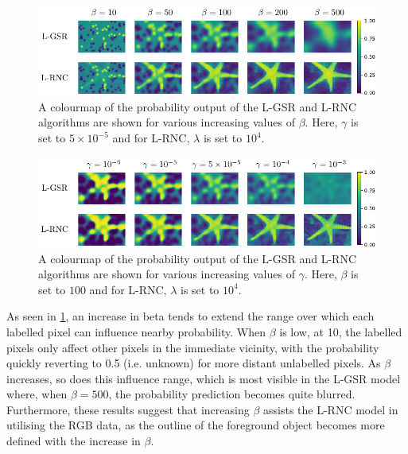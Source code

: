 \begin{figure}[t] 
    \begin{center}
        \includegraphics[width=\linewidth]{Figures/starfish2.pdf}
    \end{center}
   \caption[Qualitative effects of varying $\beta$ on the output of the L-GSR and L-RNC algorithms]{A colourmap of the probability output of the L-GSR and L-RNC algorithms are shown for various increasing values of $\beta$. Here, $\gamma$ is set to $5 \times 10^{-5}$ and for L-RNC, $\lambda$ is set to $10^4$. } 
    \label{fig:starfish2}
\end{figure}

\begin{figure}[t] 
    \begin{center}
        \includegraphics[width=\linewidth]{Figures/starfish3.pdf}
    \end{center}
    \caption[Qualitative effects of varying $\gamma$ on the output of the L-GSR and L-RNC algorithms]{A colourmap of the probability output of the L-GSR and L-RNC algorithms are shown for various increasing values of $\gamma$. Here, $\beta$ is set to $100$ and for L-RNC, $\lambda$ is set to $10^4$.}
    \label{fig:starfish3}
\end{figure}


As seen in \cref{fig:starfish2}, an increase in beta tends to extend the range over which each labelled pixel can influence nearby probability. When $\beta$ is low, at 10, the labelled pixels only affect other pixels in the immediate vicinity, with the probability quickly reverting to 0.5 (i.e. unknown) for more distant unlabelled pixels. As $\beta$ increases, so does this influence range, which is most visible in the L-GSR model where, when $\beta = 500$, the probability prediction becomes quite blurred. Furthermore, these results suggest that increasing $\beta$ assists the L-RNC model in utilising the RGB data, as the outline of the foreground object becomes more defined with the increase in $\beta$.


